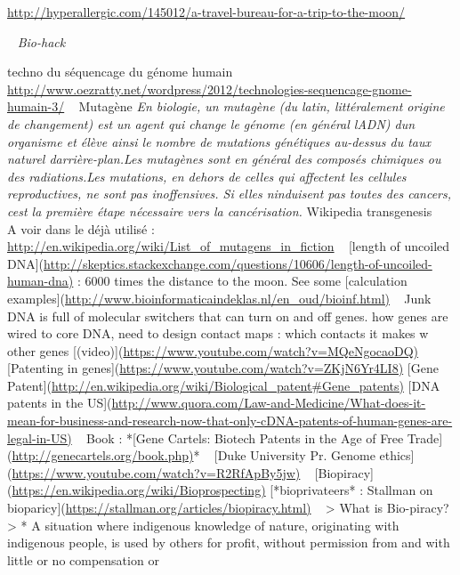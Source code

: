 \url{http://hyperallergic.com/145012/a-travel-bureau-for-a-trip-to-the-moon/}

~
\textit{Bio-hack}
~

\bigskip

techno du s\'equencage du g\'enome humain~
\url{http://www.oezratty.net/wordpress/2012/technologies-sequencage-gnome-humain-3/}
~
Mutag\`ene
\textit{{\textquotedbl}En biologie, un mutag\`ene (du latin,
litt\'eralement origine de changement) est un agent qui change le
g\'enome (en g\'en\'eral l{\textquotesingle}ADN) d{\textquotesingle}un
organisme et \'el\`eve ainsi le nombre de mutations g\'en\'etiques
au-dessus du taux naturel d{\textquotesingle}arri\`ere-plan.Les
mutag\`enes sont en g\'en\'eral des compos\'es chimiques ou des
radiations.Les mutations, en dehors de celles qui affectent les
cellules reproductives, ne sont pas inoffensives. Si elles
n{\textquotesingle}induisent pas toutes des cancers,
c{\textquotesingle}est la premi\`ere \'etape n\'ecessaire vers la
canc\'erisation.{\textquotedbl} }Wikipedia
transgenesis
~
A voir dans le d\'ej\`a utilis\'e :
~~~ \url{http://en.wikipedia.org/wiki/List_of_mutagens_in_fiction}
~
[length of uncoiled
DNA](\url{http://skeptics.stackexchange.com/questions/10606/length-of-uncoiled-human-dna)}
: 6000 times the distance to the moon. See some [calculation
examples](\url{http://www.bioinformaticaindeklas.nl/en_oud/bioinf.html)}
~
{\textquotedbl}Junk DNA{\textquotedbl} is full of molecular switchers
that can turn on and off genes. how genes are wired to core DNA, need
to design contact maps : {\textquotedbl}which contacts it makes w other
genes{\textquotedbl}
[(video)](\url{https://www.youtube.com/watch?v=MQeNgocaoDQ)}
~
[Patenting in genes](\url{https://www.youtube.com/watch?v=ZKjN6Yr4LI8)}
[Gene
Patent](\url{http://en.wikipedia.org/wiki/Biological_patent#Gene_patents)}
[DNA patents in the
US](\url{http://www.quora.com/Law-and-Medicine/What-does-it-mean-for-business-and-research-now-that-only-cDNA-patents-of-human-genes-are-legal-in-US)}
~
Book : *[Gene Cartels: Biotech Patents in the Age of Free
Trade](\url{http://genecartels.org/book.php)}*
~
[Duke University Pr. Genome
ethics](\url{https://www.youtube.com/watch?v=R2RfApBy5jw)}
~
[Biopiracy](\url{https://en.wikipedia.org/wiki/Bioprospecting)}
[*bioprivateers* : Stallman on
bioparicy](\url{https://stallman.org/articles/biopiracy.html)}
~
{\textgreater} What is Bio-piracy?
{\textgreater} * A situation where indigenous knowledge of nature,
originating with indigenous people, is used by others for profit,
without permission from and with little or no compensation or
